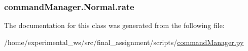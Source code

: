 \subsubsection[{\texorpdfstring{rate}{rate}}]{\setlength{\rightskip}{0pt plus 5cm}command\+Manager.\+Normal.\+rate}\hypertarget{classcommandManager_1_1Normal_a32e84cf5ac08ffeb9cb1a21d4b484a32}{}\label{classcommandManager_1_1Normal_a32e84cf5ac08ffeb9cb1a21d4b484a32}


The documentation for this class was generated from the following file\+:\begin{DoxyCompactItemize}
\item 
/home/experimental\+\_\+ws/src/final\+\_\+assignment/scripts/\hyperlink{commandManager_8py}{command\+Manager.\+py}\end{DoxyCompactItemize}
